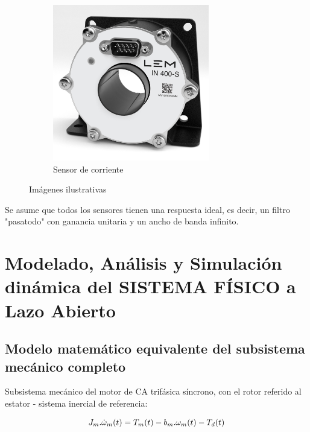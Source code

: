 \documentclass{article}
\begin{document}
\begin{figure}[ht]
\begin{subfigure}[b]{0.3\textwidth}
      \includegraphics[width=0.75\textwidth]{Alan4.jpg}
      \caption{Sensor de corriente}
    \end{subfigure}
    \caption{Imágenes ilustrativas}
  \end{figure}


Se asume que todos los sensores tienen una respuesta ideal, es decir, un filtro "pasatodo" con ganancia 
unitaria y un ancho de banda infinito.


\section{Modelado, Análisis y Simulación dinámica del SISTEMA FÍSICO a Lazo Abierto}




\subsection{Modelo matemático equivalente del subsistema mecánico completo}

Subsistema mecánico del motor de CA trifásica síncrono, con el rotor referido al estator - sistema inercial de referencia:

\begin{equation}\label{eq:1.1}
    J_{m}.\dot{\omega}_{m}(t) = T_{m}(t)-b_{m}.\omega_{m}(t)-T_{d}(t) \\
\end{equation}
\end{document}
